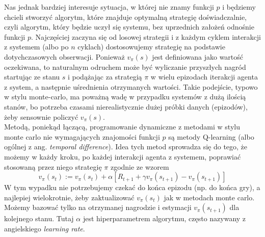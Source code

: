 \documentclass[licencjacka]{pracamgr}
\begin{document}
Nas jednak bardziej interesuje sytuacja, w której nie znamy funkcji $p$ i będziemy chcieli stworzyć algorytm, które znajduje optymalną strategię doświadczalnie, czyli algorytm, który będzie uczył się systemu, bez uprzednich założeń odnośnie funkcji $p$. Najczęściej zaczyna się od losowej strategii i z każdym cyklem interakcji z systemem (albo po $n$ cyklach) dostosowujemy strategię na podstawie dotychczasowych obserwacji. Ponieważ $v_{\pi}(s)$ jest definiowana jako wartość oczekiwana, to naturalnym odruchem może być wyliczanie przyszłych nagród startując ze stanu $s$ i podążając za strategią $\pi$ w wielu epizodach iterakcji agenta z system, a następnie uśrednienia otrzymanych wartości. Takie podejście, typowo w stylu monte-carlo, ma poważną wadę w przypadku systemów z dużą ilością stanów, bo potrzeba czasami nierealistycznie dużej próbki danych (epizodów), żeby sensownie policzyć  $v_{\pi}(s)$. \\
 
 Metodą, poniekąd łączącą, programowanie dynamiczne z metodami w stylu monte carlo nie wymagających znajomości funkcji $p$ są metody Q-learning (albo ogólnej z ang. \textit{temporal difference}).  Idea tych metod sprowadza się do tego, że możemy w każdy kroku, po każdej interakcji agenta z systemem, poprawiać stosowaną przez niego strategię $\pi$ zgodnie ze wzorem
\begin{equation}
   v_{\pi}(s_{t}) := v_{\pi}(s_{t}) +\alpha [R_{t+1} + \gamma v_{\pi}(s_{t+1}) - v_{\pi}(s_{t+1})]
 \end{equation}
 W tym wypadku nie potrzebujemy czekać do końca epizodu (np. do końca gry), a najlepiej wielokrotnie, żeby zaktualizować $v_{\pi}(s_{t})$ jak w metodach monte carlo. Możemy bazować tylko na otrzymanej nagrodzie i estymacji $v_{\pi}(s_{t+1})$ dla kolejnego stanu. Tutaj $\alpha$ jest hiperparametrem algorytmu, często nazywany z angielskiego \textit{learning rate}. 
 
\end{document}
